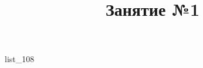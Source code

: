 \documentclass[12pt, a4paper]{article}
\begin{document}
	\title{Занятие №1}
	{list_108}
\end{document}
